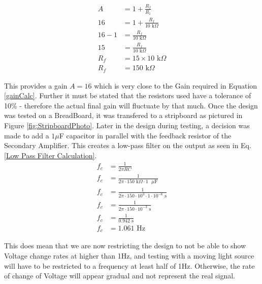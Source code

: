 \begin{equation} \label{Feedback Resistor Calculation}
  \begin{split}
  A &= 1 + \frac{R_f}{R_1} \\
  16 &= 1 + \frac{R_f}{10\text{ k}\Omega} \\
  16 - 1 &= \frac{R_f}{10\text{ k}\Omega} \\
  15 &= \frac{R_f}{10\text{ k}\Omega} \\
  R_f &= 15 \times 10\text{ k}\Omega \\
  R_f &= 150\text{ k}\Omega
  \end{split}
\end{equation}

This provides a gain $A= 16$ which is very close to the Gain required in Equation \ref{gainCalc}. Further it must be stated that the resistors used have a tolerance of 10\% - therefore the actual final gain will fluctuate by that much. Once the design was tested on a BreadBoard, it was transfered to a stripboard as pictured in Figure \ref{fig:StripboardPhoto}.
Later in the design during testing, a decision was made to add a $1\mu$F capacitor in parallel with the feedback resistor of the Secondary Amplifier. This creates a low-pass filter on the output as seen in Eq. \ref{Low Pass Filter Calculation}.
\begin{equation} \label{Low Pass Filter Calculation}
  \begin{split}
    f_c &= \frac{1}{2\pi RC} \\
    f_c &= \frac{1}{2\pi \cdot 150\text{ k}\Omega \cdot 1\text{ }\mu\text{F}} \\
    f_c &= \frac{1}{2\pi \cdot 150 \cdot 10^3 \cdot 1 \cdot 10^{-6}\text{ s}} \\
    f_c &= \frac{1}{2\pi \cdot 150 \cdot 10^{-3}\text{ s}} \\
    f_c &= \frac{1}{0.942\text{ s}} \\
    f_c &= 1.061\text{ Hz}
  \end{split}
\end{equation}

This does mean that we are now restricting the design to not be able to show Voltage change rates at higher than 1Hz, and testing with a moving light source will have to be restricted to a frequency at least half of 1Hz. Otherwise, the rate of change of Voltage will appear gradual and not represent the real signal. 



